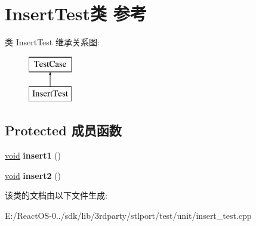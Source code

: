 \hypertarget{class_insert_test}{}\section{Insert\+Test类 参考}
\label{class_insert_test}
类 Insert\+Test 继承关系图\+:\begin{figure}[H]
\begin{center}
\leavevmode
\includegraphics[height=2.000000cm]{class_insert_test}
\end{center}
\end{figure}
\subsection*{Protected 成员函数}
\begin{DoxyCompactItemize}
\item 
\mbox{\label{class_insert_test_a363c84f2cfef29adadffcf8dc73e5838}} 
\hyperlink{interfacevoid}{void} {\bfseries insert1} ()
\item 
\mbox{\label{class_insert_test_a0f595305d78e6f19707133f15fab7f67}} 
\hyperlink{interfacevoid}{void} {\bfseries insert2} ()
\end{DoxyCompactItemize}


该类的文档由以下文件生成\+:\begin{DoxyCompactItemize}
\item 
E\+:/\+React\+O\+S-\/0../sdk/lib/3rdparty/stlport/test/unit/insert\+\_\+test.\+cpp\end{DoxyCompactItemize}
